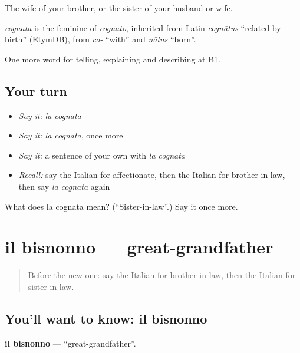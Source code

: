 The wife of your brother, or the sister of your husband or wife.

\begin{cousinweb}
\emph{cognata} is the feminine of \emph{cognato}, inherited from Latin \emph{cognātus} \textquotedblleft{}related by birth\textquotedblright{} (EtymDB), from \emph{co-} \textquotedblleft{}with\textquotedblright{} and \emph{nātus} \textquotedblleft{}born\textquotedblright{}.
\end{cousinweb}

\begin{grammarlens}[title={What you've built}]
One more word for telling, explaining and describing at B1.
\end{grammarlens}

\subsection*{Your turn}
\begin{itemize}
\raggedright
  \item \emph{Say it:} \emph{la cognata}
  \item \emph{Say it:} \emph{la cognata}, once more
  \item \emph{Say it:} a sentence of your own with \emph{la cognata}
  \item \emph{Recall:} say the Italian for affectionate, then the Italian for brother-in-law, then say \emph{la cognata} again
\end{itemize}

\begin{tcolorbox}[breakable,colback=teal!4,colframe=teal!35!black,title={Before you move on}]
What does la cognata mean? (\textquotedblleft{}Sister-in-law\textquotedblright{}.) Say it once more.
\end{tcolorbox}
\section[il bisnonno]{il bisnonno — great-grandfather}

\label{lesson:IT-C493-bisnonno}



\begin{quote}
Before the new one: say the Italian for brother-in-law, then the Italian for sister-in-law.
\end{quote}

\subsection*{You'll want to know: il bisnonno}
\textbf{il bisnonno} — \textquotedblleft{}great-grandfather\textquotedblright{}.

